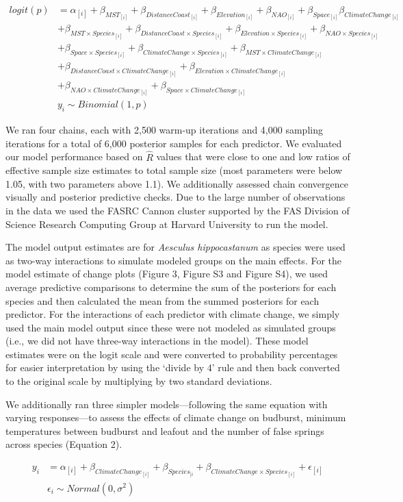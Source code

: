 \documentclass{article}\usepackage[]{graphicx}\usepackage[]{color}
\begin{document}
\begin{align*}
logit(p) &= \alpha_{[i]} + \beta_{MST_{[i]}} + \beta_{DistanceCoast_{[i]}} + \beta_{Elevation_{[i]}} + \beta_{NAO_{[i]}} + \beta_{Space_{[i]}}\beta_{ClimateChange_{[i]}} \\ 
  &+ \beta_{MST \times Species_{[i]}} + \beta_{DistanceCoast \times Species_{[i]}} + \beta_{Elevation \times Species_{[i]}} + \beta_{NAO \times Species_{[i]}}\\
  &+ \beta_{Space \times Species_{[i]}} + \beta_{ClimateChange \times Species_{[i]}} + \beta_{MST \times ClimateChange_{[i]}}\\ 
  &+ \beta_{DistanceCoast \times ClimateChange_{[i]}} + \beta_{Elevation \times ClimateChange_{[i]}}\\ 
  &+ \beta_{NAO \times ClimateChange_{[i]}} + \beta_{Space \times ClimateChange_{[i]}} \nonumber\\
  & y_i \sim Binomial(1,p) \tag{1}
\end{align*}

We ran four chains, each with 2,500 warm-up iterations and 4,000 sampling iterations for a total of 6,000 posterior samples for each predictor. We evaluated our model performance based on $\hat{R}$ values that were close to one and low ratios of effective sample size estimates to total sample size (most parameters were below 1.05, with two parameters above 1.1). We additionally assessed chain convergence visually and posterior predictive checks. Due to the large number of observations in the data we used the FASRC Cannon cluster supported by the FAS Division of Science Research Computing Group at Harvard University to run the model.

The model output estimates are for \textit{Aesculus hippocastanum} as species were used as two-way interactions to simulate modeled groups on the main effects. For the model estimate of change plots (Figure 3, Figure S3 and Figure S4), we used average predictive comparisons to determine the sum of the posteriors for each species and then calculated the mean from the summed posteriors for each predictor. For the interactions of each predictor with climate change, we simply used the main model output since these were not modeled as simulated groups (i.e., we did not have three-way interactions in the model). These model estimates were on the logit scale and were converted to probability percentages for easier interpretation by using the `divide by 4' rule \citep{Gelman2006} and then back converted to the original scale by multiplying by two standard deviations. 

We additionally ran three simpler models---following the same equation with varying responses---to assess the effects of climate change on budburst, minimum temperatures between budburst and leafout and the number of false springs across species (Equation 2).

\begin{align*}
y_i &= \alpha_{[i]} + \beta_{ClimateChange_{[i]}} + \beta_{Species_{[i}} + \beta_{ClimateChange \times Species_{[i]}} + \epsilon_{[i]} \nonumber\\
  & \epsilon_i \sim Normal(0, \sigma^{2}) \tag{2}
\end{align*}


\end{document}
